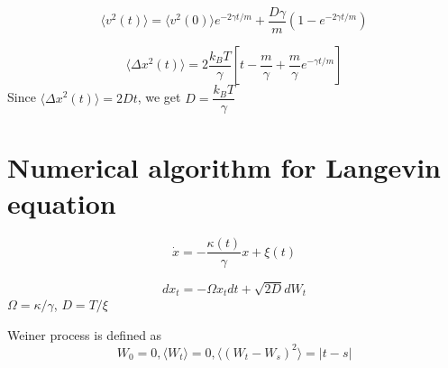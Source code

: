 \documentclass[11pt,a4paper]{article}
\begin{document}
\begin{equation}
\langle v^2 (t) \rangle = \langle v^2 (0) \rangle e^{-2\gamma t /m} + \dfrac{D \gamma}{m}(1-e^{-2\gamma t /m})
\label{var_vel}
\end{equation}


\begin{equation}
\langle \Delta x^2 (t) \rangle = 2 \dfrac{k_B T}{\gamma}\left[t-\dfrac{m}{\gamma} +\dfrac{m}{\gamma}e^{-\gamma t /m} \right]
\end{equation}
Since $\langle \Delta x^2 (t) \rangle= 2 D t$, we get $D=\dfrac{k_B T}{\gamma}$

\section{Numerical algorithm for Langevin equation}

\begin{equation}
\dot{x}= -\dfrac{\kappa(t)}{\gamma} x + \xi(t)
\end{equation}


\begin{equation}
dx_t= -\Omega x_t dt + \sqrt{2D} dW_t
\end{equation}
$\Omega=\kappa/ \gamma $, $D=T/ \xi$

Weiner process is defined as 
\begin{equation}
W_0=0, \langle W_t\rangle=0, \langle (W_t - W_s)^2\rangle=|t-s|
\end{equation}
\end{document}
